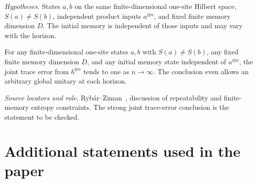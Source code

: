 \documentclass[11pt]{article}
\begin{document}
\par\medskip
\noindent\begin{minipage}{\linewidth}
\emph{Hypotheses.} States $a,b$ on the same finite-dimensional one-site Hilbert space, $S(a)\ne S(b)$, independent product inputs $a^{\otimes n}$, and fixed finite memory dimension $D$. The initial memory is independent of those inputs and may vary with the horizon.

\begin{proposition}
For any finite-dimensional one-site states $a,b$ with $S(a)\ne S(b)$, any fixed finite memory dimension $D$, and any initial memory state independent of $a^{\otimes n}$, the joint trace error from $b^{\otimes n}$ tends to one as $n\to\infty$. The conclusion even allows an arbitrary global unitary at each horizon.
\end{proposition}

\noindent\emph{Source locators and role.} Ryb\'{a}r--Ziman~\cite{rybar}, discussion of repeatability and finite-memory entropy constraints. The strong joint trace-error conclusion is the statement to be checked.
\end{minipage}
\par

\section*{Additional statements used in the paper}
\end{document}
